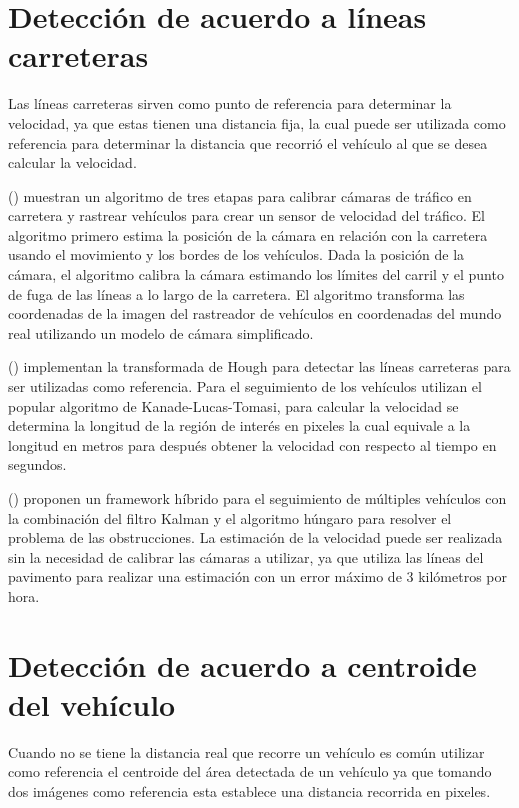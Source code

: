 \section{Detección de acuerdo a líneas carreteras }

Las líneas carreteras sirven como punto de referencia para determinar la velocidad, ya que estas tienen una distancia fija, la cual puede ser utilizada como referencia para determinar la distancia que recorrió el vehículo al que se desea calcular la velocidad. 

\citeauthor{schoepflin2003Dynamic} (\cite{schoepflin2003Dynamic}) muestran un algoritmo de tres etapas para calibrar cámaras de tráfico en carretera y rastrear vehículos para crear un sensor de velocidad del tráfico. El algoritmo primero estima la posición de la cámara en relación con la carretera usando el movimiento y los bordes de los vehículos. Dada la posición de la cámara, el algoritmo calibra la cámara estimando los límites del carril y el punto de fuga de las líneas a lo largo de la carretera. El algoritmo transforma las coordenadas de la imagen del rastreador de vehículos en coordenadas del mundo real utilizando un modelo de cámara simplificado. 

\citeauthor{bevilacqua2016Egomotion} (\cite{bevilacqua2016Egomotion}) implementan la transformada de Hough para detectar las líneas carreteras para ser utilizadas como referencia. Para el seguimiento de los vehículos utilizan el popular algoritmo de Kanade-Lucas-Tomasi, para calcular la velocidad se determina la longitud de la región de interés en pixeles la cual equivale a la longitud en metros para después obtener la velocidad con respecto al tiempo en segundos. 

\citeauthor{anil2015Real} (\cite{anil2015Real}) proponen un framework híbrido para el seguimiento de múltiples vehículos con la combinación del filtro Kalman y el algoritmo húngaro para resolver el problema de las obstrucciones. La estimación de la velocidad puede ser realizada sin la necesidad de calibrar las cámaras a utilizar, ya que utiliza las líneas del pavimento para realizar una estimación con un error máximo de 3 kilómetros por hora. 

 
\section{Detección de acuerdo a centroide del vehículo}

Cuando no se tiene la distancia real que recorre un vehículo es común utilizar como referencia el centroide del área detectada de un vehículo ya que tomando dos imágenes como referencia esta establece una distancia recorrida en pixeles. 


